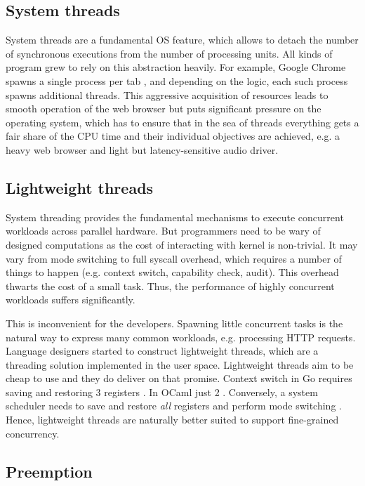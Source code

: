 \documentclass[12pt,a4paper,twoside]{report}
\begin{document}
\subsection{System threads}
\label{section:system-threads}
System threads are a fundamental OS feature, which allows to detach the number of synchronous executions from the number of processing units. All kinds of program grew to rely on this abstraction heavily. For example, Google Chrome spawns a single process per tab \cite{Howwebbr64:online}, and depending on the logic, each such process spawns additional threads. This aggressive acquisition of resources leads to smooth operation of the web browser but puts significant pressure on the operating system, which has to ensure that in the sea of threads everything gets a fair share of the CPU time and their individual objectives are achieved, e.g. a heavy web browser and light but latency-sensitive audio driver.



\subsection{Lightweight threads}
\label{section:lightweight-threads}
System threading provides the fundamental mechanisms to execute concurrent workloads across parallel hardware. But programmers need to be wary of designed computations as the cost of interacting with kernel is non-trivial. It may vary from mode switching to full syscall overhead, which requires a number of things to happen (e.g. context switch, capability check, audit). This overhead thwarts the cost of a small task. Thus, the performance of highly concurrent workloads suffers significantly.

This is inconvenient for the developers. Spawning little concurrent tasks is the natural way to express many common workloads, e.g. processing HTTP requests. Language designers started to construct lightweight threads, which are a threading solution implemented in the user space. Lightweight threads aim to be cheap to use and they do deliver on that promise. Context switch in Go requires saving and restoring 3 registers \cite{gorout_vs_os_thread}. In OCaml just 2 \cite{Sivaramakrishnan2021}. Conversely, a system scheduler needs to save and restore \textit{all} registers and perform mode switching \cite{gorout_vs_os_thread}. Hence, lightweight threads are naturally better suited to support fine-grained concurrency. 

\subsection{Preemption}
\label{section:preemption}
\end{document}
